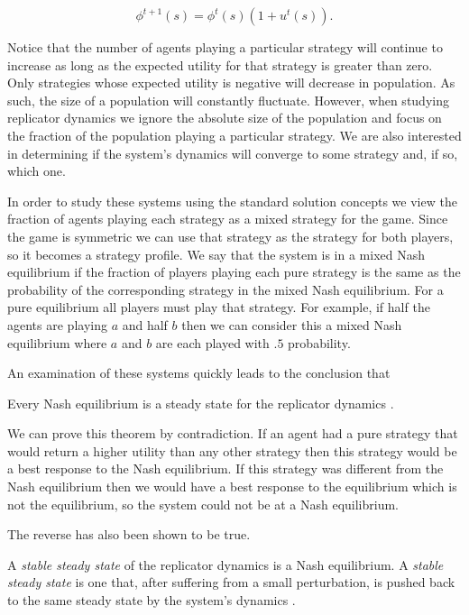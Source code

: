 \begin{equation}
  \label{eq:5}
  \phi^{t+1}(s) = \phi^t(s)(1 + u^t(s)).
\end{equation}

Notice that the number of agents playing a
particular strategy will continue to increase as long as the expected
utility for that strategy is greater than zero. Only strategies whose
expected utility is negative will decrease in population. As such, the
size of a population will constantly fluctuate. However, when studying
replicator dynamics we ignore the absolute size of the population and
focus on the fraction of the population playing a particular strategy.
We are also interested in determining if the system's dynamics will
converge to some strategy and, if so, which one.

In order to study these systems using the standard solution concepts
we view the fraction of agents playing each strategy as a mixed
strategy for the game. Since the game is symmetric we can use that
strategy as the strategy for both players, so it becomes a strategy
profile. We say that the system is in a mixed Nash equilibrium if the
fraction of players playing each pure strategy is the same as the
probability of the corresponding strategy in the mixed Nash
equilibrium.  For a pure equilibrium all players must play that
strategy. For example, if half the agents are playing $a$ and half $b$
then we can consider this a mixed Nash equilibrium where $a$ and $b$
are each played with $.5$ probability.

An examination of these systems quickly leads to the conclusion that

\begin{theorem}
  Every Nash equilibrium is a steady state for the replicator
  dynamics \cite{fudenberg98a}.
\end{theorem}

We can prove this theorem by contradiction. If an agent had a pure
strategy that would return a higher utility than any other strategy
then this strategy would be a best response to the Nash equilibrium.
If this strategy was different from the Nash equilibrium then we would
have a best response to the equilibrium which is not the equilibrium,
so the system could not be at a Nash equilibrium.

The reverse has also been shown to be true.

\begin{theorem}
  A \emph{stable steady state} of the replicator dynamics is a Nash
  equilibrium. A \emph{stable steady state} is one that, after
  suffering from a small perturbation, is pushed back to the same
  steady state by the system's dynamics \cite{fudenberg98a} .
\end{theorem}

